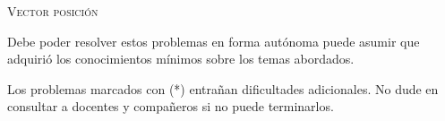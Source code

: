 \documentclass[11pt, spanish, a4paper, twoside]{article}
\begin{document}
\begin{center}
	\textsc{\large Vector posición}
\end{center}
Debe poder resolver estos problemas en forma autónoma puede asumir que adquirió los conocimientos mínimos sobre los temas abordados.

\noindent
Los problemas marcados con (*) entrañan dificultades adicionales. No dude en consultar a docentes y compañeros si no puede terminarlos.


			

\begin{enumerate}
	

\end{enumerate}
\end{document}
